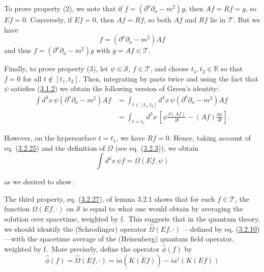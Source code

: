 \documentclass[11pt,a4paper]{article}
\begin{document}
To prove property (2), we note that if \(f=(\partial^a\partial_a-m^2)g\), then \(Af=Rf=g\), so \(Ef=0\). Conversely, if \(Ef=0\), then \(Af=Rf\), so both \(Af\) and \(Rf\) lie in \(\mathcal{T}\). But we have
\begin{equation*}
f = (\partial^a \partial_a - m^2) Af \tag{3.2.25}\label{eq:3.2.25}
\end{equation*}
and thus \(f = (\partial^a \partial_a - m^2)g\) with \(g = Af \in \mathcal{T}\).

Finally, to prove property (3), let \(\psi \in \mathcal{S}\), \(f \in \mathcal{T}\), and choose \(t_1, t_2 \in \mathbb{R}\) so that \(f=0\) for all \(t \notin [t_1, t_2]\). Then, integrating by parts twice and using the fact that \(\psi\) satisfies (\hyperref[eq:3.1.2]{3.1.2}) we obtain the following version of Green's identity:
\begin{equation*}
\begin{aligned}
\int d^4x\,\psi(\partial^a\partial_a-m^2)Af
 &= \int_{t\in[t_1,t_2]} d^4x\,\psi(\partial^a\partial_a-m^2)Af \\
 &= \int_{t=t_1} d^3x\,\left[\psi\frac{\partial(Af)}{\partial t}
       -(Af)\frac{\partial\psi}{\partial t}\right].
\end{aligned}
\tag{3.2.26}\label{eq:3.2.26}
\end{equation*}

However, on the hypersurface \(t = t_1\), we have \(Rf=0\). Hence, taking \hypertarget{source-58}{} account of eq. (\hyperref[eq:3.2.25]{3.2.25}) and the definition of \(\Omega\) (see eq. (\hyperref[eq:3.2.3]{3.2.3})), we obtain
\begin{equation*}
\int d^4x\,\psi f = \Omega(Ef, \psi) \tag{3.2.27}\label{eq:3.2.27}
\end{equation*}

as we desired to show.

The third property, eq. (\hyperref[eq:3.2.27]{3.2.27}), of lemma 3.2.1 shows that for each \(f \in \mathcal{T}\), the function \(\Omega(Ef, \cdot)\) on \(\mathcal{S}\) is equal to what one would obtain by averaging the solution over spacetime, weighted by f.~This suggests that in the quantum theory, we should identify the (Schrodinger) operator \(\widehat{\Omega}(Ef, \cdot)\) ---defined by eq. (\hyperref[eq:3.2.10]{3.2.10})---with the spacetime average of the (Heisenberg) quantum field operator, weighted by f.~More precisely, define the operator \(\widehat{\phi}(f)\) by
\begin{equation*}
\hat\phi(f)=\hat\Omega(Ef,\cdot)=ia(\overline{K(Ef)})-ia^\dagger(K(Ef)) \tag{3.2.28}\label{eq:3.2.28}
\end{equation*}
\end{document}
